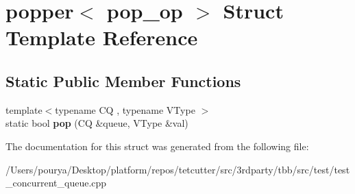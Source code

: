 \hypertarget{structpopper}{}\section{popper$<$ pop\+\_\+op $>$ Struct Template Reference}
\label{structpopper}
\subsection*{Static Public Member Functions}
\begin{DoxyCompactItemize}
\item 
\hypertarget{structpopper_af044cde4e6d7a7c0b8904193e3316609}{}{\footnotesize template$<$typename C\+Q , typename V\+Type $>$ }\\static bool {\bfseries pop} (C\+Q \&queue, V\+Type \&val)\label{structpopper_af044cde4e6d7a7c0b8904193e3316609}

\end{DoxyCompactItemize}


The documentation for this struct was generated from the following file\+:\begin{DoxyCompactItemize}
\item 
/\+Users/pourya/\+Desktop/platform/repos/tetcutter/src/3rdparty/tbb/src/test/test\+\_\+concurrent\+\_\+queue.\+cpp\end{DoxyCompactItemize}
